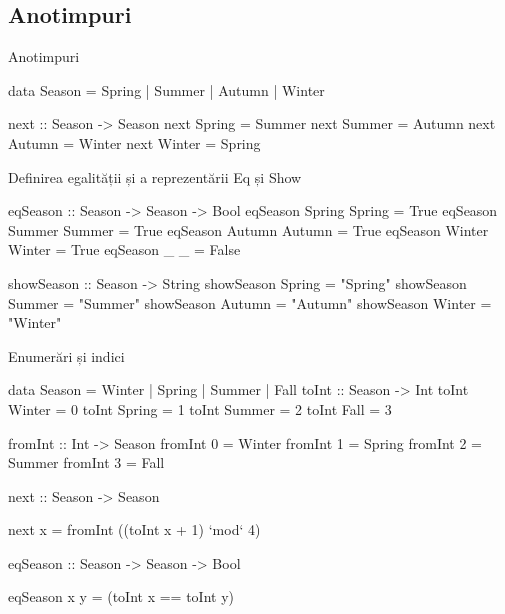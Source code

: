 \documentclass[xcolor=pdftex,romanian,colorlinks]{beamer}
\begin{document}
\subsection{Anotimpuri}

\begin{frame}[fragile]{Anotimpuri}
\begin{asciihs}
data Season = Spring | Summer | Autumn | Winter

next :: Season -> Season
next Spring = Summer
next Summer = Autumn
next Autumn = Winter
next Winter = Spring
\end{asciihs}
\end{frame}

\begin{frame}[fragile]{Definirea egalității și a reprezentării}
{Eq și Show}
\begin{asciihs}
eqSeason :: Season -> Season -> Bool
eqSeason Spring Spring = True
eqSeason Summer Summer = True
eqSeason Autumn Autumn = True
eqSeason Winter Winter = True
eqSeason _      _      = False


showSeason :: Season -> String
showSeason Spring = "Spring"
showSeason Summer = "Summer"
showSeason Autumn = "Autumn"
showSeason Winter = "Winter"
\end{asciihs}
\end{frame}


\begin{frame}[fragile]{Enumerări și indici}
\begin{asciihs}
  data Season = Winter | Spring | Summer | Fall
  toInt :: Season -> Int
  toInt Winter = 0
  toInt Spring = 1
  toInt Summer = 2
  toInt Fall   = 3

  fromInt :: Int -> Season
  fromInt 0 = Winter
  fromInt 1 = Spring
  fromInt 2 = Summer
  fromInt 3 = Fall

  next :: Season -> Season
\end{asciihs}
\vspace{-2ex}
\begin{asciihs}
  next x = fromInt ((toInt x + 1) `mod` 4)

\end{asciihs}
\begin{asciihs}
  eqSeason :: Season -> Season -> Bool
\end{asciihs}
\vspace{-2ex}
\begin{asciihs}
  eqSeason x y = (toInt x == toInt y)

\end{asciihs}
\end{frame}
\end{document}
